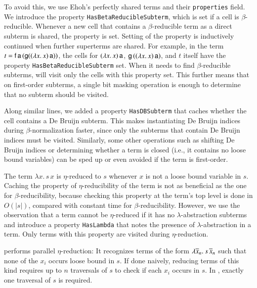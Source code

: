 To avoid this, we use Ehoh's perfectly shared
terms and their \texttt{properties} field.
%
We introduce the property \texttt{HasBetaReducibleSubterm}, which is set if
a cell is $\beta$-reducible.
Whenever a new cell that contains a
$\beta$-reducible term as a direct subterm is shared, the property is set.
Setting of the property is inductively continued when further superterms are
shared. For example, in the term $t = \mathsf{f} \, \mathsf{a} \, (\mathsf{g} ((\lambda x.\,
x)\,\mathsf{a}))$, the cells for $(\lambda x.\, x)\,\mathsf{a}$,
$\mathsf{g}\,((\lambda x.\, x)\,\mathsf{a})$, and $t$ itself have the property
\texttt{HasBetaReducibleSubterm} set.
%
When it needs to find $\beta$-reducible subterms, \ehohii{} will visit only the
cells with this property set. This further means that on first-order
subterms, a single bit masking operation is enough to determine that no subterm
should be visited.

Along similar lines, we added a property \texttt{HasDBSubterm} that
caches whether the cell contains a De Bruijn subterm. This
makes
instantiating De Bruijn indices during $\beta$-norma\-lization faster, since only the
subterms that contain De Bruijn indices must be visited. Similarly, some other
operations such as shifting De Bruijn indices or determining whether a term is closed
(i.e., it contains no loose bound variables) can be sped up or even avoided
if the term is first-order.

The term $\lambda x.\, s \, x$ is $\eta$-reduced to $s$ whenever $x$ is not a loose bound variable
in $s$. Caching the property of $\eta$-reducibility of the term is not
as beneficial as the one for $\beta$-reducibility, because checking this
property at the term's top level is done in $O(|s|)$, compared with constant time
for $\beta$-reducibility.
However, we use the observation that a term cannot be $\eta$-reduced if it has
no $\lambda$-abstraction subterms and introduce a property \texttt{HasLambda}
that notes the presence of $\lambda$-abstraction in a term. Only
terms with this property are visited during $\eta$-reduction.

\ehohii{} performs parallel $\eta$-reduction: It recognizes terms of the form
$\lambda \overline{x}_n.\> s \, \overline{x}_n  $ such that none of the $x_i$
occurs loose bound in $s$. If done naively, reducing terms of this kind requires up to $n$
traversals of $s$ to check if each $x_i$ occurs in $s$. In \ehohii{}, exactly one
traversal of $s$ is required.

